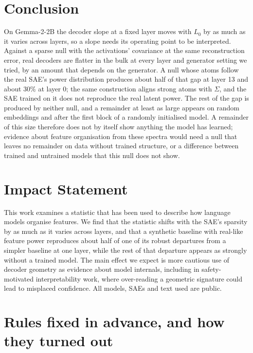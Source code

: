 \documentclass[10pt,twocolumn]{article}
\newcommand{\Sig}{\Sigma}
\newcommand{\Lz}{L_0}
\begin{document}
\section{Conclusion}

On Gemma-2-2B the decoder slope at a fixed layer moves with $\Lz$ by as much as it varies across layers, so a slope needs its operating point to be interpreted. Against a sparse null with the activations' covariance at the same reconstruction error, real decoders are flatter in the bulk at every layer and generator setting we tried, by an amount that depends on the generator. A null whose atoms follow the real SAE's power distribution produces about half of that gap at layer 13 and about 30\% at layer 0; the same construction aligns strong atoms with $\Sig$, and the SAE trained on it does not reproduce the real latent power. The rest of the gap is produced by neither null, and a remainder at least as large appears on random embeddings and after the first block of a randomly initialised model. A remainder of this size therefore does not by itself show anything the model has learned; evidence about feature organisation from these spectra would need a null that leaves no remainder on data without trained structure, or a difference between trained and untrained models that this null does not show.

\section*{Impact Statement}

This work examines a statistic that has been used to describe how language models organise features. We find that the statistic shifts with the SAE's sparsity by as much as it varies across layers, and that a synthetic baseline with real-like feature power reproduces about half of one of its robust departures from a simpler baseline at one layer, while the rest of that departure appears as strongly without a trained model. The main effect we expect is more cautious use of decoder geometry as evidence about model internals, including in safety-motivated interpretability work, where over-reading a geometric signature could lead to misplaced confidence. All models, SAEs and text used are public.




\appendix
\onecolumn

\section{Rules fixed in advance, and how they turned out}
\label{app:prereg}
\end{document}
